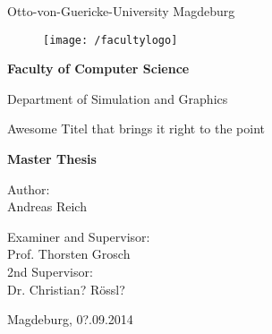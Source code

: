 \documentclass[thesis.tex]{subfiles}
\begin{document}
\thispagestyle {empty}

\begin{center}
\begin{Large}
Otto-von-Guericke-University Magdeburg\\

\begin{figure}
	\centering
	\texttt{[image: /facultylogo]}
	\label{fig:logoinffak}
\end{figure}

\vspace{3mm}

\textbf{Faculty of Computer Science}\\
\end{Large}

\vspace{3mm}

Department of Simulation and Graphics\\

\vspace{1cm}
\begin{LARGE}
Awesome Titel that brings it right to the point\\
\end{LARGE}
\vspace{15mm}
{\Huge \textbf{Master Thesis}}\\
\vspace{15mm}

Author:\\
\vspace{4mm}
{\Large Andreas Reich}\\

\vspace{10mm}

Examiner and Supervisor:\\
\vspace{2mm}
{\Large Prof. Thorsten Grosch}\\
\vspace{4mm}
2nd Supervisor:\\
\vspace{2mm}
{\Large Dr. Christian? Rössl?}\\
\vspace{4mm}

{\large Magdeburg, 0?.09.2014}\\

\vspace{40mm}

\end{center}
\clearpage
\end{document}
